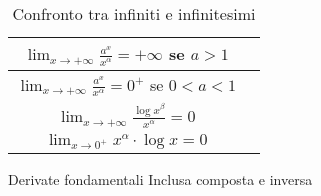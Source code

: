 \begin{table}[h!]
	\setlength{\tabcolsep}{5pt}
	\renewcommand{\arraystretch}{2.2}
	\centering
	\begin{tabular}{|c|c|}
		\hline
		$\lim_{x \rightarrow +\infty} \frac{a^x}{x^\alpha} = + \infty$ se $a>1$ \\
		\hline
		$\lim_{x \rightarrow +\infty} \frac{a^x}{x^\alpha} = 0^+$ se $0<a<1$ \\
		\hline
		$\lim_{x \rightarrow +\infty} \frac{{\log{x}}^\beta}{x^\alpha} = 0$ \\
		\hline
		$\lim_{x \rightarrow 0^+} x^\alpha \cdot \log{x} = 0$ \\
		\hline
	\end{tabular}
	\caption{Confronto tra infiniti e infinitesimi}
\end{table}

Derivate fondamentali
Inclusa composta e inversa
